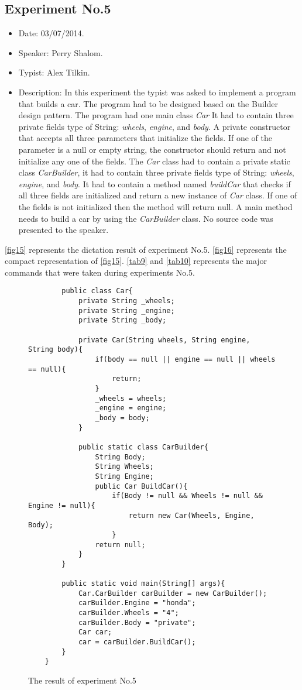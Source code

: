 \subsection{Experiment No.5}
\begin{itemize}
	\item Date: 03/07/2014.
	\item Speaker: Perry Shalom.
	\item Typist: Alex Tilkin.
	\item Description: In this experiment the typist was asked to implement a program that builds a car. The program had to be designed based on the Builder design pattern. The program had one main class \textit{Car} It had to contain three private fields type of String: \textit{wheels}, \textit{engine}, and \textit{body}. A private constructor that accepts all three parameters that initialize the fields. If one of the parameter is a null or empty string, the constructor should return and not initialize any one of the fields. The \textit{Car} class had to contain a private static class \textit{CarBuilder}, it had to contain three private fields type of String: \textit{wheels}, \textit{engine}, and \textit{body}. It had to contain a method named \textit{buildCar} that checks if all three fields are initialized and return a new instance of \textit{Car} class. If one of the fields is not initialized then the method will return null. A main method needs to build a car by using the \textit{CarBuilder} class. No source code was presented to the speaker.
\end{itemize}
\autoref{fig15} represents the dictation result of experiment No.5. \autoref{fig16} represents the compact representation of \autoref{fig15}. \autoref{tab9} and \autoref{tab10} represents the major commands that were taken during experiments No.5.
\begin{figure}[H]
	\begin{lstlisting}
		public class Car{
			private String _wheels;
			private String _engine;
			private String _body;
			
			private Car(String wheels, String engine, String body){
				if(body == null || engine == null || wheels == null){
					return;
				}
				_wheels = wheels;
				_engine = engine;
				_body = body;
			}
			
			public static class CarBuilder{
				String Body;
				String Wheels;
				String Engine;
				public Car BuildCar(){
					if(Body != null && Wheels != null && Engine != null){
						return new Car(Wheels, Engine, Body);
					}
				return null;
			}
		}
		
		public static void main(String[] args){
			Car.CarBuilder carBuilder = new CarBuilder();
			carBuilder.Engine = "honda";
			carBuilder.Wheels = "4";
			carBuilder.Body = "private";
			Car car;
			car = carBuilder.BuildCar();
		}
	}
	\end{lstlisting}
	\caption{The result of experiment No.5}
	\label{fig15}
\end{figure}
